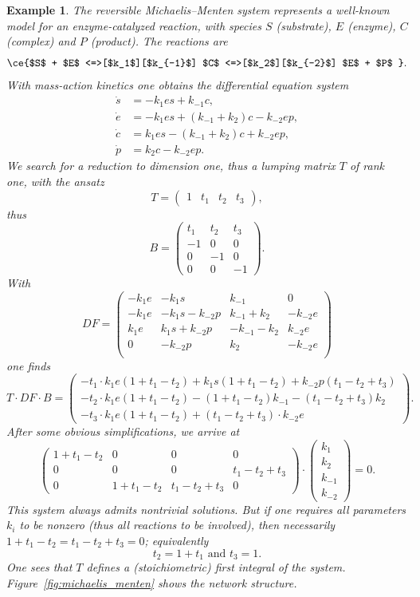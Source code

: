 \documentclass{article}
\newtheorem{example}{Example}
\begin{document}
\begin{example}\label{ex:mmsmall}{\em 
    The reversible Michaelis--Menten system represents a well-known model for an enzyme-catalyzed reaction, with species $S$ (substrate), $E$ (enzyme), $C$ (complex) and $P$ (product). The reactions are
\begin{equation*}
   \ce{$S$ + $E$ <=>[$k_1$][$k_{-1}$] $C$ <=>[$k_2$][$k_{-2}$] $E$ + $P$ }.
\end{equation*}
With mass-action kinetics one obtains the differential equation system
\begin{align*} 
\dot s &= -k_1es + k_{-1}c, \\
\dot e &= -k_1es + (k_{-1}+k_2)c- k_{-2}ep,\\
\dot c &=  k_1es - (k_{-1}+k_2)c+ k_{-2}ep,\\
\dot p &= k_2c - k_{-2}ep.
\end{align*}
We search for a reduction to dimension one, thus a lumping matrix $T$ of rank one, with the ansatz
\[
T=\begin{pmatrix} 1&t_1&t_2&t_3\end{pmatrix},
\]
thus
\[
B=\begin{pmatrix}
    t_1&t_2&t_3\\ -1&0&0\\ 0&-1&0\\ 0&0&-1
\end{pmatrix}.
\]
With
\[
DF=\begin{pmatrix}-k_1e&-k_1s&k_{-1} & 0\\
-k_1e&-k_1s-k_{-2}p&k_{-1}+k_2 & -k_{-2} e\\
k_1e&k_1s+k_{-2}p&-k_{-1}-k_2 & k_{-2} e\\
0&-k_{-2}p&k_2 & -k_{-2} e\\
\end{pmatrix}
\]
one finds
\[
T\cdot DF\cdot B=\begin{pmatrix}
   - t_1\cdot k_1e(1+t_1-t_2)+ k_1s(1+t_1-t_2)+k_{-2}p(t_1-t_2+t_3)\\
  -t_2 \cdot k_1e(1+t_1-t_2)-(1+t_1-t_2)k_{-1}-(t_1-t_2+t_3)k_2\\
  - t_3\cdot k_1e(1+t_1-t_2)+(t_1-t_2+t_3)\cdot k_{-2}e
\end{pmatrix}.
\]
After some obvious simplifications, we arrive at
\[
\begin{pmatrix}
    1+t_1-t_2&0&0&0\\
    0&0&0&t_1-t_2+t_3\\
    0&1+t_1-t_2&t_1-t_2+t_3&0
\end{pmatrix}\cdot\begin{pmatrix}
    k_1\\ k_2\\ k_{-1}\\ k_{-2}
\end{pmatrix} =0.
\]
This system always admits nontrivial solutions. But if one requires all parameters $k_i$ to be nonzero (thus all reactions to be involved), then necessarily $1+t_1-t_2=t_1-t_2+t_3=0$; equivalently
\[
t_2=1+t_1\text{  and  } t_3=1.
\]
One sees that $T$ defines a (stoichiometric) first integral of the system. Figure~\ref{fig:michaelis_menten} shows the network structure.
}
\end{example}
\end{document}
